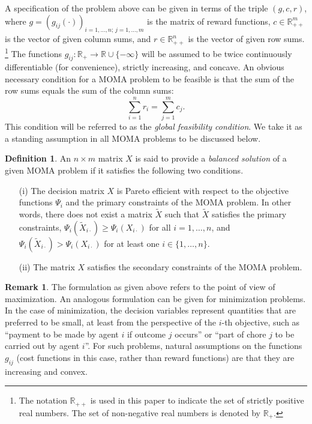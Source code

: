 \documentclass{article}
\newcommand{\mR}{\mathbb{R}}
\theoremstyle{definition}
\newtheorem{definition}[theorem]{Definition}
\newtheorem{remark}[theorem]{Remark}
\renewcommand{\baselinestretch}{1.5}
\let\origfootnote\footnote
\renewcommand{\footnote}[1]{%
   \begingroup
   \renewcommand{\baselinestretch}{1}%
   \origfootnote{#1}%
   \endgroup}
\begin{document}
\vskip2mm
A specification of the problem above can be given in terms of the triple $(g,c,r)$, where $g = (g_{ij}(\cdot))_{i=1,\dots,n;\,j=1,\dots,m}$ is the matrix of reward functions, $c \in \mR^m_{++}$ is the vector of given column sums, and $r \in \mR^n_{++}$ is the vector of given row sums.\footnote{The notation $\mR_{++}$ is used in this paper to indicate the set of strictly positive real numbers. The set of non-negative real numbers is denoted by $\mR_+$.}
The functions $g_{ij}: \mR_+ \rightarrow \mR \cup \{-\infty\}$ will be assumed to be twice continuously differentiable (for convenience), strictly increasing, and concave. An obvious necessary condition for a MOMA problem to be feasible is that the sum of the row sums equals the sum of the column sums:
\begin{equation}\label{gfc}
\sum_{i=1}^n r_i = \sum_{j=1}^m c_j.
\end{equation}
This condition will be referred to as the \emph{global feasibility condition}. We take it as a standing assumption in all MOMA problems to be discussed below.

\begin{definition} \label{balanced}
An $n \times m$ matrix $X$ is said to provide a \emph{balanced solution} of a given MOMA problem if it satisfies the following two conditions.
\begin{itemize}
\item[(i)] The decision matrix $X$ is Pareto efficient with respect to the objective functions $\Psi_i$ and the primary constraints of the MOMA problem. In other words, there does not exist a matrix $\tilde{X}$ such that $\tilde{X}$ satisfies the primary constraints, $\Psi_i(\tilde{X}_{i\cdot}) \geq \Psi_i(X_{i\cdot})$ for all $i=1,\dots,n$, and $\Psi_i(\tilde{X}_{i\cdot}) > \Psi_i(X_{i\cdot})$ for at least one $i \in \{1,\dots,n\}$.
\item[(ii)] The matrix $X$ satisfies the secondary constraints of the MOMA problem.
\end{itemize}
\end{definition}

\begin{remark}
The formulation as given above refers to the point of view of maximization. An analogous formulation can be given for minimization problems. In the case of minimization, the decision variables represent quantities that are preferred to be small, at least from the perspective of the $i$-th objective, such as ``payment to be made by agent $i$ if outcome $j$ occurs'' or ``part of chore $j$ to be carried out by agent $i$''\!. For such problems, natural assumptions on the functions $g_{ij}$ (cost functions in this case, rather than reward functions) are that they are increasing and convex.
\end{remark}
\end{document}
